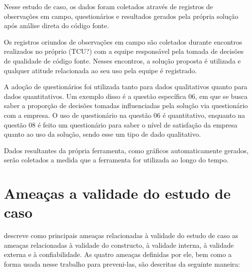 Nesse estudo de caso, os dados foram coletados através de registros de observações em campo, questionários e resultados gerados pela própria solução após análise direta do código fonte.

Os registros oriundos de observações em campo são coletados durante encontros realizados no próprio (TCU?) com a equipe responsável pela tomada de decisões de qualidade de código fonte. Nesses encontros, a solução proposta é utilizada e qualquer atitude relacionada ao seu uso pela equipe é registrado.

A adoção de questionários foi utilizada tanto para dados qualitativos quanto para dados quantitativos. Um exemplo disso é a questão específica 06, em que se busca saber a proporção de decisões tomadas influenciadas pela solução via questionário com a empresa. O uso de questionário na questão 06 é quantitativo, enquanto na questão 08 é feito um questionário para saber o nível de satisfação da empresa quanto ao uso da solução, sendo esse um tipo de dado qualitativo.

Dados resultantes da própria ferramenta, como gráficos automaticamente gerados, serão coletados a medida que a ferramenta for utilizada ao longo do tempo.

\section{Ameaças a validade do estudo de caso}

 descreve como principais ameaças relacionadas à validade do estudo de caso as ameaças relacionadas à validade do constructo, à validade interna, à validade externa e à confiabilidade. As quatro ameaças definidas por ele, bem como a forma usada nesse trabalho para preveni-las, são descritas da seguinte maneira: 

